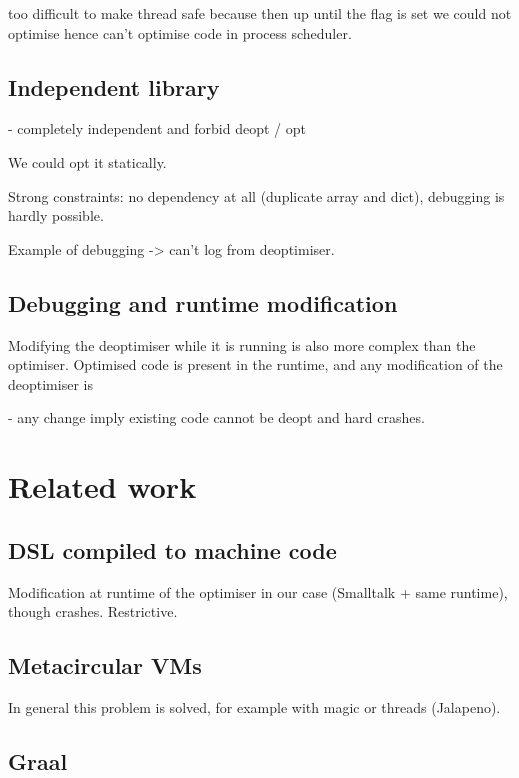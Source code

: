 \documentclass[a4paper,12pt,twoside]{../includes/ThesisStyle}
\begin{document}
too difficult to make thread safe because then up until the flag is set we could not optimise hence can't optimise code in process scheduler.

\subsection{Independent library}

- completely independent and forbid deopt / opt

We could opt it statically.

Strong constraints: no dependency at all (duplicate array and dict), debugging is hardly possible.

Example of debugging -> can't log from deoptimiser. 

\subsection{Debugging and runtime modification}

Modifying the deoptimiser while it is running is also more complex than the optimiser. Optimised code is present in the runtime, and any modification of the deoptimiser is

- any change imply existing code cannot be deopt and hard crashes.


\section{Related work}

\subsection{DSL compiled to machine code}

Modification at runtime of the optimiser in our case (Smalltalk + same runtime), though crashes.
Restrictive.

\subsection{Metacircular VMs}

In general this problem is solved, for example with magic or threads (Jalapeno).

\subsection{Graal}
\end{document}
